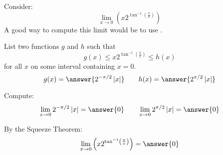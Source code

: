 \documentclass{ximera}
\author{Bart Snapp}
\begin{document}
\begin{exercise}


Consider:
\[
\lim_{x\to 0} \left(x 2^{\tan ^{-1}\left(\frac{\pi }{x}\right)}\right)
\]
A good way to compute this limit would be to use .
\begin{exercise}
List two functions $g$ and $h$ such that
\[
g(x)\le x 2^{\tan ^{-1}\left(\frac{\pi }{x}\right)} \le h(x)
\]
for all $x$ on some interval containing $x=0$.
\[
g(x)=\answer{2^{-\pi /2} \left| x\right|}\qquad h(x) =\answer{2^{\pi /2} \left| x\right|}
\]
\begin{exercise}
Compute:
\[
\lim_{x \to 0}2^{-\pi /2} \left| x\right| = \answer{0}\qquad \lim_{x\to 0}2^{\pi /2} \left| x\right| = \answer{0}
\]
\begin{exercise}
By the Squeeze Theorem:
\[
\lim_{x\to 0} \left(x 2^{\tan ^{-1}\left(\frac{\pi }{x}\right)}\right) = \answer{0}
\]
\end{exercise}
\end{exercise}
\end{exercise}
\end{exercise}
\end{document}
